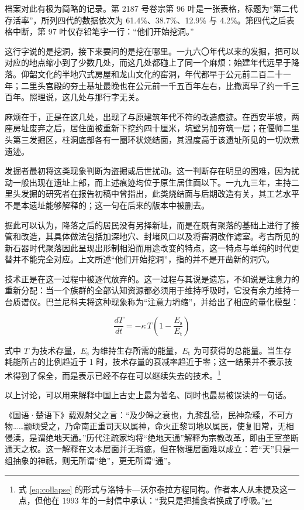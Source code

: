 档案对此有极为简略的记录。第 2187 号卷宗第 96 叶是一张表格，标题为“第二代存活率”，所列四代的数据依次为 61.4\%、38.7\%、12.9\% 与 4.2\%。第四代之后表格中断，第 97 叶仅存铅笔字一行：“他们开始挖洞。”

这行字说的是挖洞，接下来要问的是挖在哪里。一九六〇年代以来的发掘，把可以对应的地点缩小到了少数几处，而这几处都碰上了同一个麻烦：始建年代远早于降落。仰韶文化的半地穴式房屋和龙山文化的窑洞，年代都早于公元前二百二十一年；二里头宫殿的夯土基址最晚也在公元前一千五百年左右，比撤离早了约一千三百年。照理说，这几处与那行字无关。

麻烦在于，正是在这几处，出现了与原建筑年代不符的改造痕迹。在西安半坡，两座房址废弃之后，居住面被重新下挖约四十厘米，坑壁另加夯筑一层；在偃师二里头第三发掘区，柱洞底部各有一圈环状烧结面，其温度高于该遗址所见的一切炊煮遗迹。

发掘者最初将这类现象判断为盗掘或后世扰动。这一判断存在明显的困难，因为扰动一般出现在遗址上部，而上述痕迹均位于原生居住面以下。一九九三年，主持二里头发掘的研究者在报告初稿中曾指出，此类烧结面与后期改造有关，其工艺水平不是本遗址能够解释的；这一句在后来的版本中被删去。

据此可以认为，降落之后的居民没有另择新址，而是在既有聚落的基础上进行了接管和改造，其具体做法包括加深地穴、封堵风口以及将窑洞改作滤室。考古所见的新石器时代聚落因此呈现出形制相沿而用途改变的特点，这一特点与单纯的时代更替并不能完全对应。上文所述“他们开始挖洞”，指的并不是开凿新的洞穴。

技术正是在这一过程中被逐代放弃的。这一过程与其说是遗忘，不如说是注意力的重新分配：当一个族群的全部认知资源都必须用于维持呼吸时，它没有余力维持一台质谱仪。巴兰尼科夫将这种现象称为“注意力坍缩”，并给出了相应的量化模型：

\begin{equation}
\frac{dT}{dt} = -\kappa \, T \left(1 - \frac{E_{\mathrm{s}}}{E_{\mathrm{t}}}\right)
\label{eq:collapse}
\end{equation}

式中 $T$ 为技术存量，$E_{\mathrm{s}}$ 为维持生存所需的能量，$E_{\mathrm{t}}$ 为可获得的总能量。当生存耗能所占的比例趋近于 1 时，技术存量的衰减率趋近于零；这一结果并不表示技术得到了保全，而是表示已经不存在可以继续失去的技术。\footnote{式 \eqref{eq:collapse} 的形式与洛特卡—沃尔泰拉方程同构。作者本人从未提及这一点，但他在 1993 年的一封信中承认：“我只是把捕食者换成了呼吸。”}

以上讨论，可以用来解释中国上古史上最为著名、同时也最易被误读的一句话。

《国语·楚语下》载观射父之言：“及少皞之衰也，九黎乱德，民神杂糅，不可方物……颛顼受之，乃命南正重司天以属神，命火正黎司地以属民，使复旧常，无相侵渎，是谓绝地天通。”历代注疏家均将“绝地天通”解释为宗教改革，即由王室垄断通天之权。这一解释在文本层面并无瑕疵，但在物理层面难以成立：若“天”只是一组抽象的神祇，则无所谓“绝”，更无所谓“通”。

